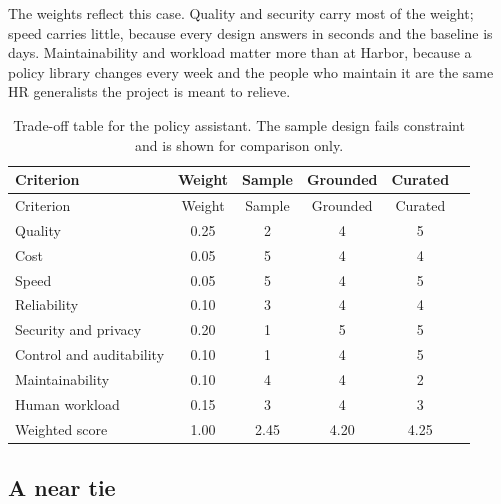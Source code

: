 The weights reflect this case. Quality and security carry most of the weight; speed carries little, because every design answers in seconds and the baseline is days. Maintainability and workload matter more than at Harbor, because a policy library changes every week and the people who maintain it are the same HR generalists the project is meant to relieve.

\begingroup
\small
\begin{longtable}{@{}lccccc@{}}
\caption{Trade-off table for the policy assistant. The sample design fails constraint  and is shown for comparison only.}\label{tab:policy-tradeoff}\\
\toprule
\rowcolor{coHead} Criterion & Weight & Sample & Grounded & Curated \\
\midrule
\endfirsthead
\toprule
\rowcolor{coHead} Criterion & Weight & Sample & Grounded & Curated \\
\midrule
\endhead
Quality & 0.25 & 2 & 4 & 5 \\
Cost & 0.05 & 5 & 4 & 4 \\
Speed & 0.05 & 5 & 4 & 5 \\
Reliability & 0.10 & 3 & 4 & 4 \\
Security and privacy & 0.20 & 1 & 5 & 5 \\
Control and auditability & 0.10 & 1 & 4 & 5 \\
Maintainability & 0.10 & 4 & 4 & 2 \\
Human workload & 0.15 & 3 & 4 & 3 \\
\midrule
\rowcolor{coAmberBg} Weighted score & 1.00 & 2.45 & 4.20 & 4.25 \\
\bottomrule
\end{longtable}
\endgroup

\subsection{A near tie}

